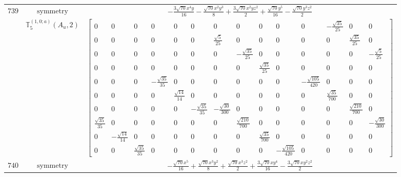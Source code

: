 \documentclass[fleqn,8pt,landscape]{jsarticle}
\begin{document}
\begin{longtable}{ccc}
$ 739 $ & $ \text{symmetry} $ & $ - \frac{3 \sqrt{70} x^{4} y}{16} - \frac{\sqrt{70} x^{2} y^{3}}{8} + \frac{3 \sqrt{70} x^{2} y z^{2}}{2} + \frac{\sqrt{70} y^{5}}{16} - \frac{\sqrt{70} y^{3} z^{2}}{2} $ \\
$  $ & $ \mathbb{T}_{5}^{(1,0;a)}(A_{u},2) $ & $ \begin{bmatrix} 0 & 0 & 0 & 0 & 0 & 0 & 0 & 0 & 0 & 0 & 0 & - \frac{\sqrt{35}}{25} & 0 & 0 \\ 0 & 0 & 0 & 0 & 0 & 0 & \frac{\sqrt{5}}{25} & 0 & 0 & 0 & 0 & 0 & \frac{\sqrt{35}}{25} & 0 \\ 0 & 0 & 0 & 0 & 0 & 0 & 0 & - \frac{\sqrt{35}}{25} & 0 & 0 & 0 & 0 & 0 & - \frac{\sqrt{5}}{25} \\ 0 & 0 & 0 & 0 & 0 & 0 & 0 & 0 & \frac{\sqrt{35}}{25} & 0 & 0 & 0 & 0 & 0 \\ 0 & 0 & 0 & - \frac{\sqrt{35}}{35} & 0 & 0 & 0 & 0 & 0 & 0 & - \frac{\sqrt{105}}{420} & 0 & 0 & 0 \\ 0 & 0 & 0 & 0 & \frac{\sqrt{14}}{14} & 0 & 0 & 0 & 0 & 0 & 0 & \frac{\sqrt{35}}{700} & 0 & 0 \\ 0 & 0 & 0 & 0 & 0 & - \frac{\sqrt{35}}{35} & - \frac{\sqrt{30}}{300} & 0 & 0 & 0 & 0 & 0 & \frac{\sqrt{210}}{700} & 0 \\ \frac{\sqrt{35}}{35} & 0 & 0 & 0 & 0 & 0 & 0 & \frac{\sqrt{210}}{700} & 0 & 0 & 0 & 0 & 0 & - \frac{\sqrt{30}}{300} \\ 0 & - \frac{\sqrt{14}}{14} & 0 & 0 & 0 & 0 & 0 & 0 & \frac{\sqrt{35}}{700} & 0 & 0 & 0 & 0 & 0 \\ 0 & 0 & \frac{\sqrt{35}}{35} & 0 & 0 & 0 & 0 & 0 & 0 & - \frac{\sqrt{105}}{420} & 0 & 0 & 0 & 0 \end{bmatrix} $ \\ \hline
$ 740 $ & $ \text{symmetry} $ & $ - \frac{\sqrt{70} x^{5}}{16} + \frac{\sqrt{70} x^{3} y^{2}}{8} + \frac{\sqrt{70} x^{3} z^{2}}{2} + \frac{3 \sqrt{70} x y^{4}}{16} - \frac{3 \sqrt{70} x y^{2} z^{2}}{2} $ \\

\end{longtable}
\end{document}

